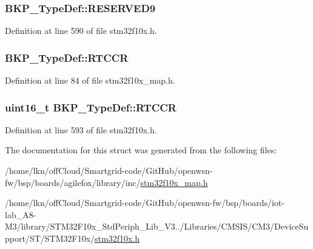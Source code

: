 \subsubsection[{\texorpdfstring{R\+E\+S\+E\+R\+V\+E\+D9}{RESERVED9}}]{ B\+K\+P\+\_\+\+Type\+Def\+::\+R\+E\+S\+E\+R\+V\+E\+D9}\hypertarget{struct_b_k_p___type_def_a9efc1ff7c68b6adbe832ad858f7ab4f5}{}\label{struct_b_k_p___type_def_a9efc1ff7c68b6adbe832ad858f7ab4f5}


Definition at line 590 of file stm32f10x.\+h.

\subsubsection[{\texorpdfstring{R\+T\+C\+CR}{RTCCR}}]{ B\+K\+P\+\_\+\+Type\+Def\+::\+R\+T\+C\+CR}\hypertarget{struct_b_k_p___type_def_ab5b6b3b4254ec135074242fbbc511ddd}{}\label{struct_b_k_p___type_def_ab5b6b3b4254ec135074242fbbc511ddd}


Definition at line 84 of file stm32f10x\+\_\+map.\+h.

\subsubsection[{\texorpdfstring{R\+T\+C\+CR}{RTCCR}}]{ {\bf uint16\+\_\+t} B\+K\+P\+\_\+\+Type\+Def\+::\+R\+T\+C\+CR}\hypertarget{struct_b_k_p___type_def_a4f876006771eb447cb9a8bbb18a7aa10}{}\label{struct_b_k_p___type_def_a4f876006771eb447cb9a8bbb18a7aa10}


Definition at line 593 of file stm32f10x.\+h.



The documentation for this struct was generated from the following files\+:\begin{DoxyCompactItemize}
\item 
/home/lkn/off\+Cloud/\+Smartgrid-\/code/\+Git\+Hub/openwsn-\/fw/bsp/boards/agilefox/library/inc/\hyperlink{agilefox_2library_2inc_2stm32f10x__map_8h}{stm32f10x\+\_\+map.\+h}\item 
/home/lkn/off\+Cloud/\+Smartgrid-\/code/\+Git\+Hub/openwsn-\/fw/bsp/boards/iot-\/lab\+\_\+\+A8-\/\+M3/library/\+S\+T\+M32\+F10x\+\_\+\+Std\+Periph\+\_\+\+Lib\+\_\+\+V3../\+Libraries/\+C\+M\+S\+I\+S/\+C\+M3/\+Device\+Support/\+S\+T/\+S\+T\+M32\+F10x/\hyperlink{iot-lab___a8-_m3_2library_2_s_t_m32_f10x___std_periph___lib___v3_85_80_2_libraries_2_c_m_s_i_s_26497265545392eb5694b064ae15018db}{stm32f10x.\+h}\end{DoxyCompactItemize}
